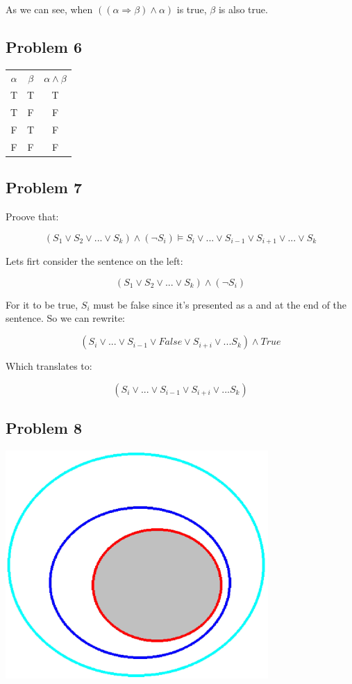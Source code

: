 \documentclass{article}
\begin{document}
As we can see, when $(( \alpha  \Rightarrow  \beta ) \wedge  \alpha )$ is true, $ \beta $ is also true.

\subsection{Problem 6}

\begin{tabular}{ | c | c | c | }
\hline
{\bf $ \alpha $} & {\bf $ \beta $} & {\bf $ \alpha \wedge  \beta $} \\
T & T & T \\
\hline
T & F & F \\
\hline
F & T & F \\
\hline
F & F & F \\
\hline
\end{tabular}

\subsection{Problem 7}

Proove that:

\[
(S_1 \vee S_2 \vee ... \vee S_k) \wedge (\neg S_i) \models S_i \vee ... \vee S_{i-1} \vee S_{i+1} \vee ... \vee S_k 
\]

Lets firt consider the sentence on the left:

\[
(S_1 \vee S_2 \vee ... \vee S_k) \wedge (\neg S_i)
\]

For it to be true, $S_i$ must be false since it's presented as a and at the end of the sentence. So we can rewrite:

\[
(S_i \vee ... \vee S_{i-1} \vee False \vee S_{i+i} \vee ... S_k) \wedge True
\]

Which translates to:

\[
(S_i \vee ... \vee S_{i-1} \vee S_{i+i} \vee ... S_k)
\]

\subsection{Problem 8}

\includegraphics[width=100mm]{entails.eps}
\end{document}
